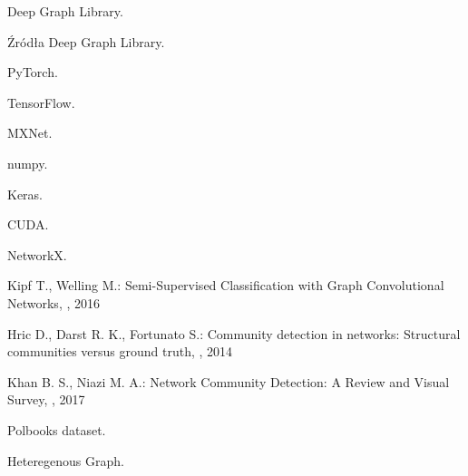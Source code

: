 \documentclass{article}
\begin{document}
  


\clearpage
\renewcommand\refname{Źródła}
\begin{thebibliography}{1}

\newblock Deep Graph Library. 

\newblock Źródła Deep Graph Library. 

\newblock PyTorch. 

\newblock TensorFlow. 

\newblock MXNet. 

\newblock numpy. 

\newblock Keras. 

\newblock CUDA. 

\newblock NetworkX. 

Kipf T., Welling M.:
\newblock Semi-Supervised Classification with Graph Convolutional Networks,
, 2016

Hric D., Darst R. K., Fortunato S.:
\newblock Community detection in networks: Structural communities versus ground truth,
, 2014

Khan B. S., Niazi M. A.:
\newblock Network Community Detection: A Review and Visual Survey,
, 2017

\newblock Polbooks dataset. 

\newblock Heteregenous Graph. 

\end{thebibliography}
\end{document}
